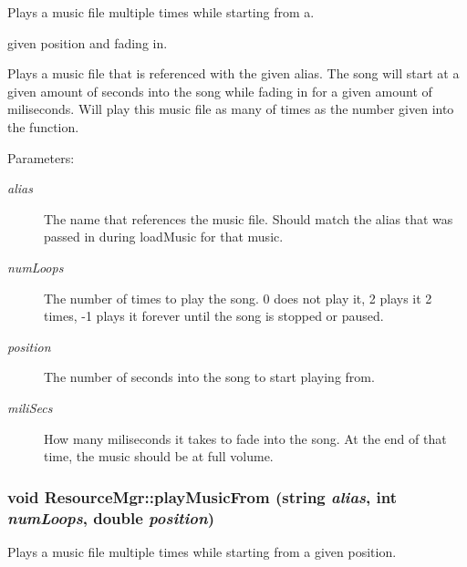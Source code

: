 Plays a music file multiple times while starting from a. 

given position and fading in.

Plays a music file that is referenced with the given alias. The song will start at a given amount of seconds into the song while fading in for a given amount of miliseconds. Will play this music file as many of times as the number given into the function. \begin{Desc}
\item[Parameters:]
\begin{description}
\item[{\em alias}]The name that references the music file. Should match the alias that was passed in during loadMusic for that music. \item[{\em numLoops}]The number of times to play the song. 0 does not play it, 2 plays it 2 times, -1 plays it forever until the song is stopped or paused. \item[{\em position}]The number of seconds into the song to start playing from. \item[{\em miliSecs}]How many miliseconds it takes to fade into the song. At the end of that time, the music should be at full volume. \end{description}
\end{Desc}
\hypertarget{class_resource_mgr_828047831e8668f7189770e45afa50c3}{
\subsubsection[{playMusicFrom}]{\setlength{\rightskip}{0pt plus 5cm}void ResourceMgr::playMusicFrom (string {\em alias}, \/  int {\em numLoops}, \/  double {\em position})}}
\label{class_resource_mgr_828047831e8668f7189770e45afa50c3}


Plays a music file multiple times while starting from a given position. 

